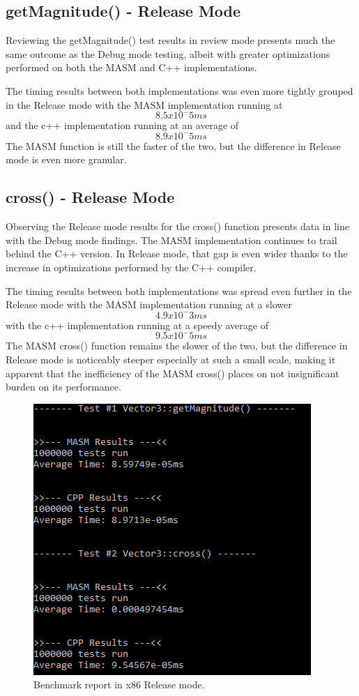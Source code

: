 \documentclass[12pt]{article}
\begin{document}
\subsection{getMagnitude() - Release Mode}
Reviewing the getMagnitude() test results in review mode presents much the same outcome as the Debug mode testing, albeit with greater optimizations performed on both the MASM and C++ implementations. 

The timing results between both implementations was even more tightly grouped in the Release mode with the MASM implementation running at \[8.5x10^-5ms\]
and the c++ implementation running at an average of \[8.9x10^-5ms\]
The MASM function is still the faster of the two, but the difference in Release mode is even more granular.

\subsection{cross() - Release Mode}
Observing the Release mode results for the cross() function presents data in line with the Debug mode findings. The MASM implementation continues to trail behind the C++ version. In Release mode, that gap is even wider thanks to the  increase in optimizations performed by the C++ compiler. 

The timing results between both implementations was spread even further in the Release mode with the MASM implementation running at a slower \[4.9x10^-3ms\] with the c++ implementation running at a speedy average of \[9.5x10^-5ms\]
The MASM cross() function remains the slower of the two, but the difference in Release mode is noticeably steeper especially at such a small scale, making it apparent that the inefficiency of the MASM cross() places on not insignificant burden on its performance.

\begin{figure}[!htb]
  \centering
  \includegraphics[scale=1.25]{img/release_results.PNG}
  \caption{Benchmark report in x86 Release mode.}
  \label{fig:relase}
\end{figure}

\clearpage


\end{document}
